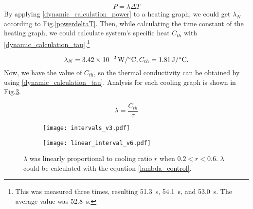 \begin{equation} \label{dynamic_calculation_power}
P = \lambda\Delta{T}
\end{equation}
By applying \eqref{dynamic_calculation_power} to a heating graph, we could get $\lambda_{N}$ according to Fig.\ref{powerdeltaT}. Then, while calculating the time constant of the heating graph, we could calculate \scp system's specific heat $C_{th}$ with \eqref{dynamic_calculation_tau}.\footnote{This was measured three times, resulting \SI{51.3}{\second}, \SI{54.1}{\second}, and \SI{53.0}{\second}. The average value was \SI{52.8}{\second}.} 

\begin{equation}
\lambda_{N}=\SI{3.42e-2}{\watt\per\degreeCelsius}, C_{th}=\SI{1.81}{\joule\per\degreeCelsius}. \notag
\end{equation}
Now, we have the value of $C_{th}$, so the thermal conductivity can be obtained by using \eqref{dynamic_calculation_tau}. Analysis for each cooling graph is shown in Fig.\ref{analysis_dynamic}.

\begin{equation} \label{dynamic_calculation_tau}
\lambda = \frac{C_{th}}{\tau}
\end{equation}

\begin{figure}[t]
	\begin{subfigure}[t]{0.52\linewidth}
		\centering\texttt{[image: intervals\_v3.pdf]}
		\caption{\label{dynamic_proportional}}
	\end{subfigure}%
	\begin{subfigure}[t]{0.39\linewidth}
		\centering\texttt{[image: linear\_interval\_v6.pdf]}
		\caption{\label{linear_interval}}
	\end{subfigure}
	\caption[Analysis of the dynamic experiment]{ $\lambda$ was linearly proportional to cooling ratio $r$ when $0.2<r<0.6$.   $\lambda$ could be calculated with the equation \eqref{lambda_control}.}
	\label{analysis_dynamic}
\end{figure}

